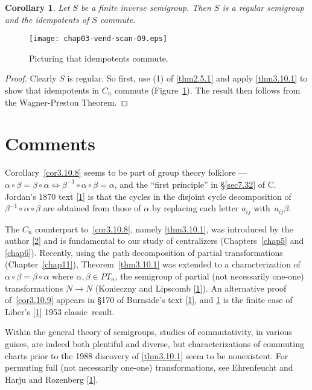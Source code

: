 \documentclass{surv-l}
\numberwithin{equation}{section}
\numberwithin{table}{section}
\numberwithin{figure}{section}
\newtheorem{corollary}[equation]{Corollary}
\theoremstyle{definition}
\begin{document}
\begin{corollary}\label{cor3.10.10}
Let $S$ be a finite inverse semigroup. Then
$S$ is a regular semigroup and the idempotents of $S$ commute.
\end{corollary}

\setcounter{figure}{10}
\begin{figure}[!h]
\texttt{[image: chap03-vend-scan-09.eps]}
\caption{Picturing that idempotents commute.\label{fig3.10.11}}
\end{figure}

\begin{proof} Clearly $S$ is regular. So first, use (1) of \ref{thm2.5.1} and apply
\ref{thm3.10.1} to show that idempotents in $C_{n}$ commute
(Figure~\ref{fig3.10.11}). The result then follows from the
Wagner-Preston Theorem.
\end{proof}

\section{Comments}\label{sec3.11}

Corollary~\ref{cor3.10.8} seems to be part of group theory
folklore --- $\alpha \circ\beta=\beta\circ\alpha
\Leftrightarrow\beta^{-1}\circ \alpha \circ\beta=\alpha$, and the
``first principle'' in \S\ref{sec7.32} of C.
Jordan's 1870 text
[\hyperlink{bib34}{1}] is that the cycles in the disjoint
cycle decomposition of $\beta^{-1}\circ \alpha \circ\beta$ are
obtained from those of $\alpha$ by replacing each letter $a_{ij}$
with~$a_{ij}\beta$.

The $C_{n}$ counterpart to~\ref{cor3.10.8}, namely
\ref{thm3.10.1}, was introduced by the author
[\hyperlink{bib43a}{2}] and is fundamental to our study
of centralizers (Chapters~\ref{chap5} and \ref{chap6}). Recently,
using the path decomposition of partial transformations
(Chapter~\ref{chap11}), Theorem~\ref{thm3.10.1} was extended to a
characterization of $\alpha \circ\beta=\beta \circ\alpha$ where
$\alpha,\beta\in PT_{n}$, the semigroup of partial (not
necessarily one-one) transformations $N\rightarrow N$
(Konieczny and Lipscomb
[\hyperlink{bib37}{1}]). An alternative proof
of~\ref{cor3.10.9} appears in \S170 of Burnside's text [\hyperlink{bib6}{1}], and \ref{cor3.10.10} is
the finite case of Liber's
[\hyperlink{bib42}{1}] 1953 classic~result.

Within the general theory of semigroups, studies of commutativity,
in various guises, are indeed both plentiful and diverse, but
characterizations of commuting charts
prior to the 1988 discovery of \ref{thm3.10.1} seem to be
nonexistent. For permuting full (not necessarily one-one)
transformations, see Ehrenfeucht and Harju and
Rozenberg [\hyperlink{bib13}{1}].
\end{document}
